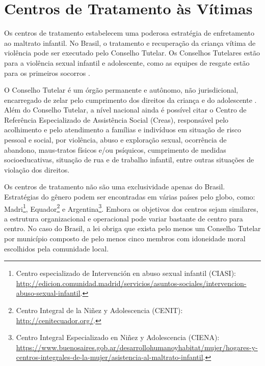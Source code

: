 


\section{Centros de Tratamento às Vítimas}\label{sec:centros}


Os centros de tratamento estabelecem uma poderosa estratégia de enfretamento ao maltrato infantil. No Brasil, o tratamento e recuperação da criança vítima de violência pode ser executado pelo Conselho Tutelar. Os Conselhos Tutelares estão para a violência sexual infantil e adolescente, como as equipes de resgate estão para os primeiros socorros \cite{caccia2014conselheiros}.


O Conselho Tutelar é um órgão permanente e autônomo, não jurisdicional, encarregado de zelar pelo cumprimento dos direitos da criança e do adolescente \cite{saude2002notificacao}. Além do Conselho Tutelar, a nível nacional ainda é possível citar o Centro de Referência Especializado de Assistência Social (Creas), responsável pelo acolhimento e pelo atendimento a famílias e indivíduos em situação de risco pessoal e social, por violência, abuso e exploração sexual, ocorrência de abandono, maus-tratos físicos e/ou psíquicos, cumprimento de medidas socioeducativas, situação de rua e de trabalho infantil, entre outras situações de violação dos direitos.

Os centros de tratamento não são uma exclusividade apenas do Brasil. Estratégias do gênero podem ser encontradas em várias países pelo globo, como: Madri\footnote{ Centro especializado de Intervención en abuso sexual infantil (CIASI): \url{http://edicion.comunidad.madrid/servicios/asuntos-sociales/intervencion-abuso-sexual-infantil}.}, Equador\footnote{Centro Integral de la Niñez y Adolescencia (CENIT): \url{http://cenitecuador.org/}.} %
e Argentina\footnote{Centro Integral Especializado en Niñez y Adolescencia (CIENA): \url{https://www.buenosaires.gob.ar/desarrollohumanoyhabitat/mujer/hogares-y-centros-integrales-de-la-mujer/asistencia-al-maltrato-infantil}.}. Embora os objetivos dos centros sejam similares, a estrutura organizacional e operacional pode variar bastante de centro para centro. No caso do Brasil, a lei obriga que exista pelo menos um Conselho Tutelar por município composto de pelo menos cinco membros com idoneidade moral escolhidos pela comunidade local. %

